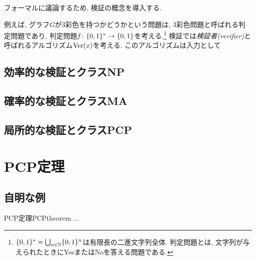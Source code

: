 フォーマルに議論するため, 検証の概念を導入する.

例えば, グラフ$G$が3彩色を持つかどうかという問題は, 3彩色問題と呼ばれる判定問題であり,
判定問題$f\colon\{0,1\}^*\to\{0,1\}$を考える.\footnote{$\{0,1\}^*=\bigcup_{n\in\mathbb{N}}\{0,1\}^n$は有限長の二進文字列全体. 判定問題とは, 文字列が与えられたときにYesまたはNoを答える問題である.}
検証では\emph{検証者(verifier)}と呼ばれるアルゴリズム$\mathrm{Ver}(x)$を考える.
このアルゴリズムは入力として

\subsection{効率的な検証とクラスNP}
\subsection{確率的な検証とクラスMA}
\subsection{局所的な検証とクラスPCP}

\section{PCP定理}

\subsection{自明な例}

\begin{theorem}{PCP定理}{PCPtheorem}
  ...
\end{theorem}
